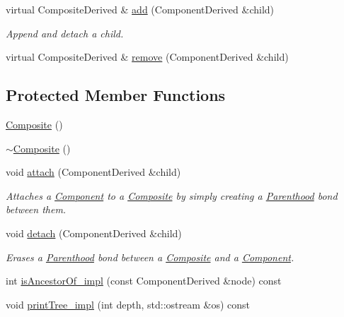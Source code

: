 {\bf }\par
\begin{DoxyCompactItemize}
\item 
virtual Composite\+Derived \& \hyperlink{classocra_1_1Composite_a6751fd4b421edc193c10c858b5f00a34}{add} (Component\+Derived \&child)
\begin{DoxyCompactList}\small\item\em Append and detach a child. \end{DoxyCompactList}\item 
virtual Composite\+Derived \& \hyperlink{classocra_1_1Composite_a93b8f85ae3267400fdddad9078945e07}{remove} (Component\+Derived \&child)
\end{DoxyCompactItemize}

\subsection*{Protected Member Functions}
\begin{DoxyCompactItemize}
\item 
\hyperlink{classocra_1_1Composite_a20b2ebe11c98b53d3d04dc7d1a7a1b60}{Composite} ()
\item 
\hyperlink{classocra_1_1Composite_add2839972d0072ced63b5a3a71fbf065}{$\sim$\+Composite} ()
\item 
void \hyperlink{classocra_1_1Composite_aad6fa3cad37014c0d7a09adf336aafa7}{attach} (Component\+Derived \&child)
\begin{DoxyCompactList}\small\item\em Attaches a \hyperlink{classocra_1_1Component}{Component} to a \hyperlink{classocra_1_1Composite}{Composite} by simply creating a \hyperlink{classocra_1_1Parenthood}{Parenthood} bond between them. \end{DoxyCompactList}\item 
void \hyperlink{classocra_1_1Composite_a6fed8be8a53ab9a5d3a3575a30ee70b9}{detach} (Component\+Derived \&child)
\begin{DoxyCompactList}\small\item\em Erases a \hyperlink{classocra_1_1Parenthood}{Parenthood} bond between a \hyperlink{classocra_1_1Composite}{Composite} and a \hyperlink{classocra_1_1Component}{Component}. \end{DoxyCompactList}\item 
int \hyperlink{classocra_1_1Composite_aec6dc98deb22fb10e21ce1cf1c0314a7}{is\+Ancestor\+Of\+\_\+impl} (const Component\+Derived \&node) const
\item 
void \hyperlink{classocra_1_1Composite_a99934c9b17849dd55075c4c773008dae}{print\+Tree\+\_\+impl} (int depth, std\+::ostream \&os) const
\end{DoxyCompactItemize}
